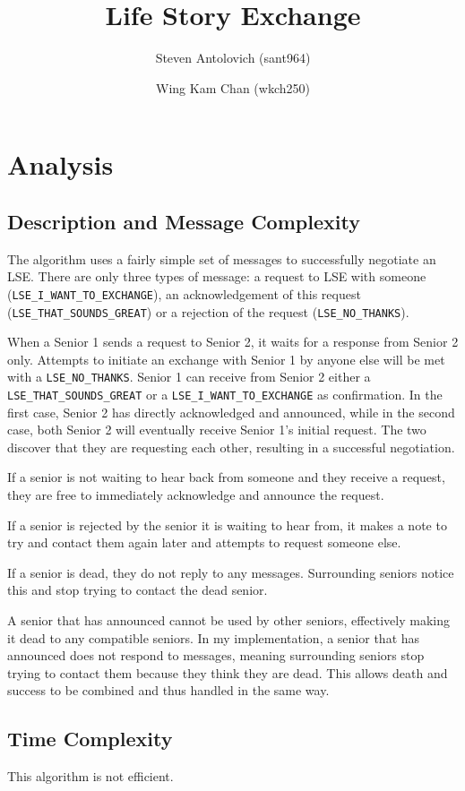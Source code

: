 \documentclass[a4paper]{article}
\title{Life Story Exchange}
\author{Steven Antolovich (sant964) \and Wing Kam Chan (wkch250)}
\begin{document}
\maketitle

\section{Analysis}
\subsection{Description and Message Complexity}
The algorithm uses a fairly simple set of messages to successfully negotiate an LSE. There are only three types of message: a request to LSE with someone (\texttt{LSE\_I\_WANT\_TO\_EXCHANGE}), an acknowledgement of this request (\texttt{LSE\_THAT\_SOUNDS\_GREAT}) or a rejection of the request (\texttt{LSE\_NO\_THANKS}). 

When a Senior 1 sends a request to Senior 2, it waits for a response from Senior 2 only. Attempts to initiate an exchange with Senior 1 by anyone else will be met with a \texttt{LSE\_NO\_THANKS}. Senior 1 can receive from Senior 2 either a \texttt{LSE\_THAT\_SOUNDS\_GREAT} or a \texttt{LSE\_I\_WANT\_TO\_EXCHANGE} as confirmation. In the first case, Senior 2 has directly acknowledged and announced, while in the second case, both Senior 2 will eventually receive Senior 1's initial request. The two discover that they are requesting each other, resulting in a successful negotiation. 

If a senior is not waiting to hear back from someone and they receive a request, they are free to immediately acknowledge and announce the request. 

If a senior is rejected by the senior it is waiting to hear from, it makes a note to try and contact them again later and attempts to request someone else. 

If a senior is dead, they do not reply to any messages. Surrounding seniors notice this and stop trying to contact the dead senior. 

A senior that has announced cannot be used by other seniors, effectively making it dead to any compatible seniors. In my implementation, a senior that has announced does not respond to messages, meaning surrounding seniors stop trying to contact them because they think they are dead. This allows death and success to be combined and thus handled in the same way. 

\subsection{Time Complexity}
This algorithm is not efficient.
\end{document}
